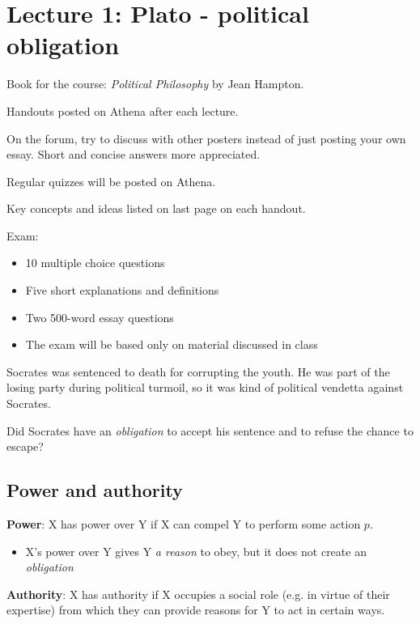 \section{Lecture 1: Plato - political obligation}

Book for the course: \textit{Political Philosophy} by Jean Hampton.

Handouts posted on Athena after each lecture.

On the forum, try to discuss with other posters instead of just posting your
own essay. Short and concise answers more appreciated.

Regular quizzes will be posted on Athena.

Key concepts and ideas listed on last page on each handout.

Exam:

\begin{itemize}
    \item 10 multiple choice questions
    \item Five short explanations and definitions
    \item Two 500-word essay questions
    \item The exam will be based only on material discussed in class
\end{itemize}

Socrates was sentenced to death for corrupting the youth. He was part of the
losing party during political turmoil, so it was kind of political vendetta
against Socrates.

Did Socrates have an \textit{obligation} to accept his sentence and to refuse
the chance to escape?

\subsection{Power and authority}

\textbf{Power}: X has power over Y if X can compel Y to perform some action
$p$.
\begin{itemize}
    \item X's power over Y gives Y \textit{a reason} to obey, but it does not
    create an \textit{obligation}
\end{itemize}

\textbf{Authority}: X has authority if X occupies a social role (e.g. in virtue
of their expertise) from which they can provide reasons for Y to act in certain
ways.

